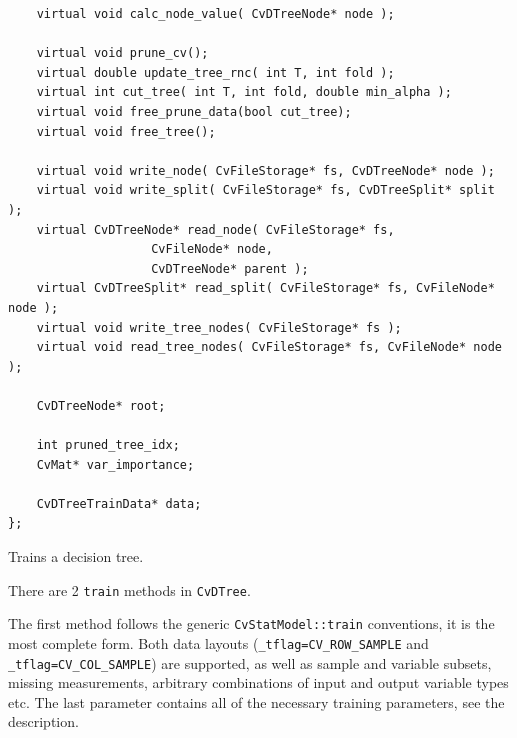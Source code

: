 \begin{lstlisting}
    virtual void calc_node_value( CvDTreeNode* node );

    virtual void prune_cv();
    virtual double update_tree_rnc( int T, int fold );
    virtual int cut_tree( int T, int fold, double min_alpha );
    virtual void free_prune_data(bool cut_tree);
    virtual void free_tree();

    virtual void write_node( CvFileStorage* fs, CvDTreeNode* node );
    virtual void write_split( CvFileStorage* fs, CvDTreeSplit* split );
    virtual CvDTreeNode* read_node( CvFileStorage* fs, 
				    CvFileNode* node, 
				    CvDTreeNode* parent );
    virtual CvDTreeSplit* read_split( CvFileStorage* fs, CvFileNode* node );
    virtual void write_tree_nodes( CvFileStorage* fs );
    virtual void read_tree_nodes( CvFileStorage* fs, CvFileNode* node );

    CvDTreeNode* root;

    int pruned_tree_idx;
    CvMat* var_importance;

    CvDTreeTrainData* data;
};
\end{lstlisting}



Trains a decision tree.


There are 2 \texttt{train} methods in \texttt{CvDTree}.

The first method follows the generic \texttt{CvStatModel::train} conventions,  it is the most complete form. Both data layouts (\texttt{\_tflag=CV\_ROW\_SAMPLE} and \texttt{\_tflag=CV\_COL\_SAMPLE}) are supported, as well as sample and variable subsets, missing measurements, arbitrary combinations of input and output variable types etc. The last parameter contains all of the necessary training parameters, see the  description.

